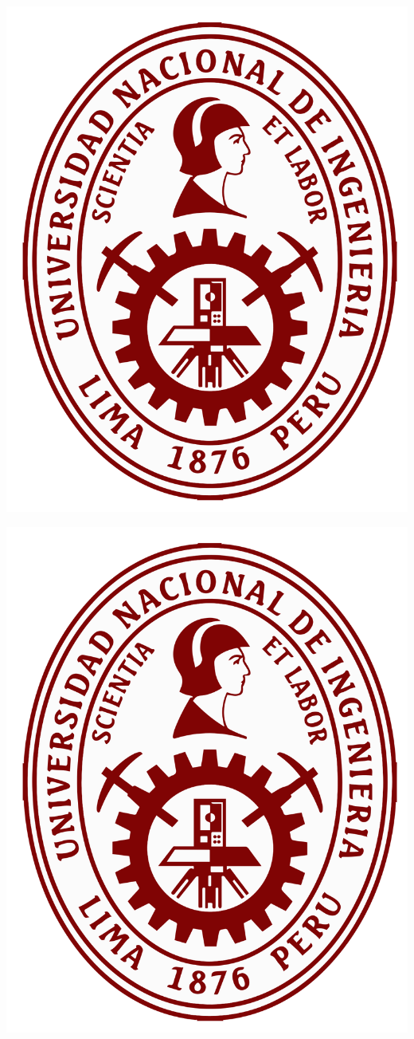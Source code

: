 \documentclass{article}
\begin{document}
\includegraphics[scale=0.3]{logo}

\newpage

\begin{center}
\includegraphics[scale=0.1]{logo}
\end{center}
\end{document}
